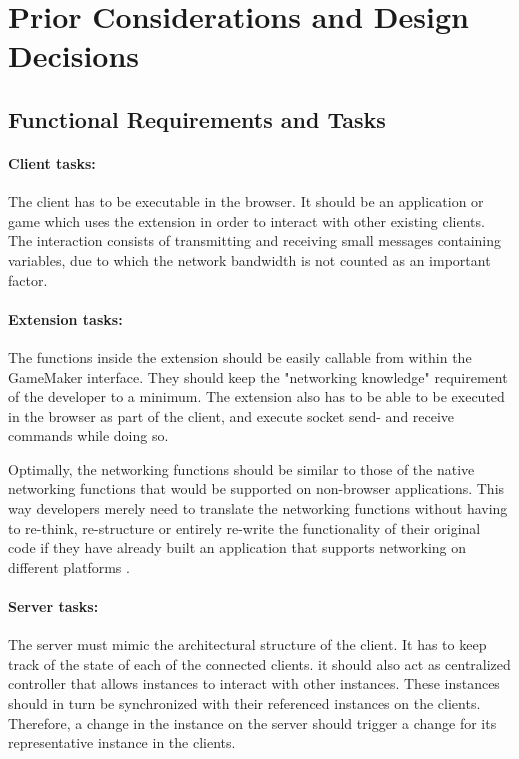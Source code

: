 \documentclass[bsc, 12pt, twoside, singlespacing, parskip, abbrevs, notimes, normalheadings, logo, deptreport]{styles/infthesis}
\begin{document}
\section{Prior Considerations and Design Decisions}

\subsection{Functional Requirements and Tasks}
\paragraph*{Client tasks:}
The client has to be executable in the browser. It should be an application or game which uses the extension in order to interact with other existing clients. The interaction consists of transmitting and receiving small messages containing variables, due to which the network bandwidth is not counted as an important factor.

\paragraph*{Extension tasks:}
The functions inside the extension should be easily callable from within the GameMaker interface. They should keep the "networking knowledge" requirement of the developer to a minimum. The extension also has to be able to be executed in the browser as part of the client, and execute socket send- and receive commands while doing so.

Optimally, the networking functions should be similar to those of the native networking functions that would be supported on non-browser applications. This way developers merely need to translate the networking functions without having to re-think, re-structure or entirely  re-write the functionality of their original code if they have already built an application that supports networking on different platforms \cite{Software_Engineering}.

\paragraph*{Server tasks:}
The server must mimic the architectural structure of the client. It has to keep track of the state of each of the connected clients. it should also act as centralized controller that allows instances to interact with other instances. These instances should in turn be synchronized with their referenced instances on the clients. Therefore, a change in the instance on the server should trigger a change for its representative instance in the clients.
\end{document}
